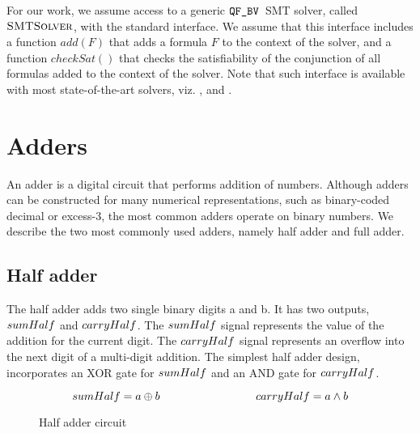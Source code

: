 For our work, we assume access to a generic $\texttt{QF\_BV}$~SMT solver, called
$\textsc{SMTSolver}$, with the standard interface.
%
We assume that this interface includes a function $add(F)$ that adds a
formula $F$ to the context of the solver, and a function $checkSat()$
that checks the satisfiability of the conjunction of all formulas
added to the context of the solver.  Note that such interface is
available with most state-of-the-art solvers, viz. {\boolector},
{\cvcfour} and {\zthree}.


\section{Adders}

An adder is a digital circuit that performs addition of numbers.
Although adders can be constructed for many numerical representations, such as binary-coded decimal or excess-3, the most common adders operate on binary numbers. We describe the two most commonly used 
adders, namely half adder and full adder.

\subsection{Half adder}

The half adder adds two single binary digits a and b. It has two outputs, $sumHalf$ and $carryHalf$. The $sumHalf$ signal represents the value of the addition for the current digit. The $carryHalf$ signal represents an overflow into the next digit of a multi-digit addition.
The simplest half adder design, incorporates an XOR gate for $sumHalf$ and an AND gate for $carryHalf$.

\[
\sumOfHalfAdder = a \oplus b \hspace{3 cm} \carryOfHalfAdder = a \land b 
\]

\begin{figure}[t]
\usetikzlibrary[arrows]
\centering
{}
\caption{Half adder circuit}
\end{figure}

